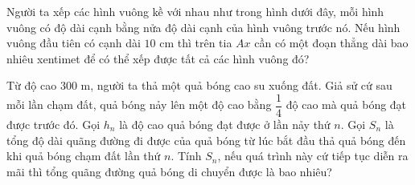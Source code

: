 

\begin{ex}%
	Người ta xếp các hình vuông kề với nhau như trong hình dưới đây, mỗi hình vuông có độ dài cạnh bằng nửa độ dài cạnh của hình vuông trước nó. Nếu hình vuông đầu tiên có cạnh dài $10$ cm thì trên tia $Ax$ cần có một đoạn thẳng dài bao nhiêu xentimet để có thể xếp được tất cả các hình vuông đó? 
	\begin{center}
	\end{center}
\end{ex}

\begin{ex}%
	Từ độ cao $300$ m, người ta thả một quả bóng cao su xuống đất. Giả sử cứ sau mỗi lần chạm đất, quả bóng nảy lên một độ cao bằng $\dfrac{1}{4}$ độ cao mà quả bóng đạt được trước đó. Gọi $h_n$ là độ cao quả bóng đạt được ở lần nảy thứ $n$. Gọi $S_n$ là tổng độ dài quãng đường  đi được của quả bóng từ lúc bắt đầu thả quả bóng đến khi quả bóng chạm đất lần thứ $n$. Tính $S_n$, nếu quá trình này cứ tiếp tục diễn ra mãi thì tổng quãng đường quả bóng di chuyển được là bao nhiêu?
\end{ex}

